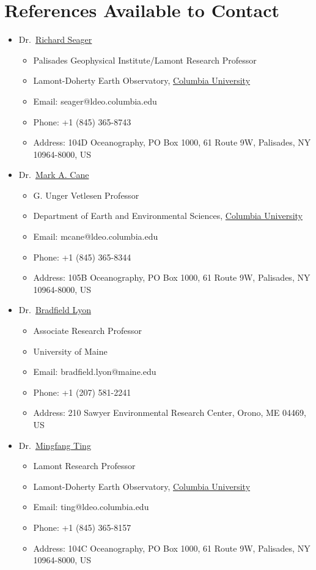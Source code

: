 \documentclass[11pt]{article}
\newcommand{\cu}{\href{http://www.columbia.edu}{Columbia University}}
\newcommand{\richard}{\href{http://www.ldeo.columbia.edu/res/div/ocp/people/seager/}{Richard Seager}}
\newcommand{\cane}{\href{http://www.ldeo.columbia.edu/user/mcane}{Mark A. Cane}}
\newcommand{\mingfang}{\href{http://www.ldeo.columbia.edu/user/ting}{Mingfang Ting}}
\newcommand{\brad}{\href{http://climatechange.umaine.edu/people/profile/bradfield_lyon}
{Bradfield Lyon}}
\begin{document}
\section{References Available to Contact}
\begin{itemize}[leftmargin=4ex]
	\item Dr.~\richard{}
	\begin{itemize}
		\item Palisades Geophysical Institute/Lamont Research Professor 
		\item Lamont-Doherty Earth Observatory, \cu{}
    		\item Email: seager@ldeo.columbia.edu
		\item Phone: +1 (845) 365-8743 
    	 	\item Address: 104D Oceanography, PO Box 1000, 61 Route 9W, Palisades, NY 10964-8000, US 
	 	\end{itemize}
	
	\item Dr.~\cane{}
	\begin{itemize}
		\item G. Unger Vetlesen Professor
		\item Department of Earth and Environmental Sciences, \cu{}
    		\item Email: mcane@ldeo.columbia.edu
		\item Phone: +1 (845) 365-8344 
    	 	\item Address: 105B Oceanography, PO Box 1000, 61 Route 9W, Palisades, NY 10964-8000, US 
	 	\end{itemize}
	
	\item Dr.~\brad{}
	\begin{itemize}
		\item Associate Research Professor
		\item University of Maine
    		\item Email: bradfield.lyon@maine.edu
		\item Phone: +1 (207) 581-2241
    	 	\item Address: 210 Sawyer Environmental Research Center, Orono, ME 04469, US 
	 	\end{itemize}
	
	\item Dr.~\mingfang{}
	\begin{itemize}
		\item Lamont Research Professor
		\item Lamont-Doherty Earth Observatory, \cu{}
    		\item Email: ting@ldeo.columbia.edu
		\item Phone: +1 (845) 365-8157 
    	 	\item Address: 104C Oceanography, PO Box 1000, 61 Route 9W, Palisades, NY 10964-8000, US 
	 	\end{itemize}
	

\end{itemize}
\end{document}

